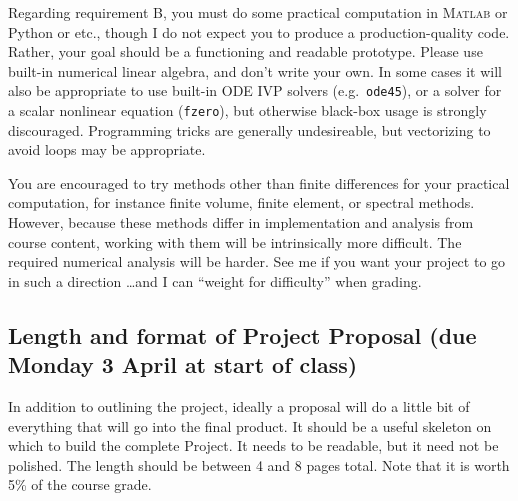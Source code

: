 \documentclass[11pt]{amsart}
\newcommand{\Matlab}{\textsc{Matlab}\xspace}
\begin{document}
Regarding requirement B, you must do some practical computation in \Matlab or Python or etc., though I do not expect you to produce a production-quality code.  Rather, your goal should be a functioning and readable prototype.  Please use built-in numerical linear algebra, and don't write your own.  In some cases it will also be appropriate to use built-in ODE IVP solvers (e.g.~\texttt{ode45}), or a solver for a scalar nonlinear equation (\texttt{fzero}), but otherwise black-box usage is strongly discouraged.  Programming tricks are generally undesireable, but vectorizing to avoid loops may be appropriate.

You are encouraged to try methods other than finite differences for your practical computation, for instance finite volume, finite element, or spectral methods.  However, because these methods differ in implementation and analysis from course content, working with them will be intrinsically more difficult.  The required numerical analysis will be harder.  See me if you want your project to go in such a direction \dots and I can ``weight for difficulty'' when grading.

\subsection*{Length and format of Project Proposal (due Monday 3 April at start of class)}  In addition to outlining the project, ideally a proposal will do a little bit of everything that will go into the final product.  It should be a useful skeleton on which to build the complete Project.  It needs to be readable, but it need not be polished.  The length should be between 4 and 8 pages total.  Note that it is worth 5\% of the course grade. 
\end{document}
